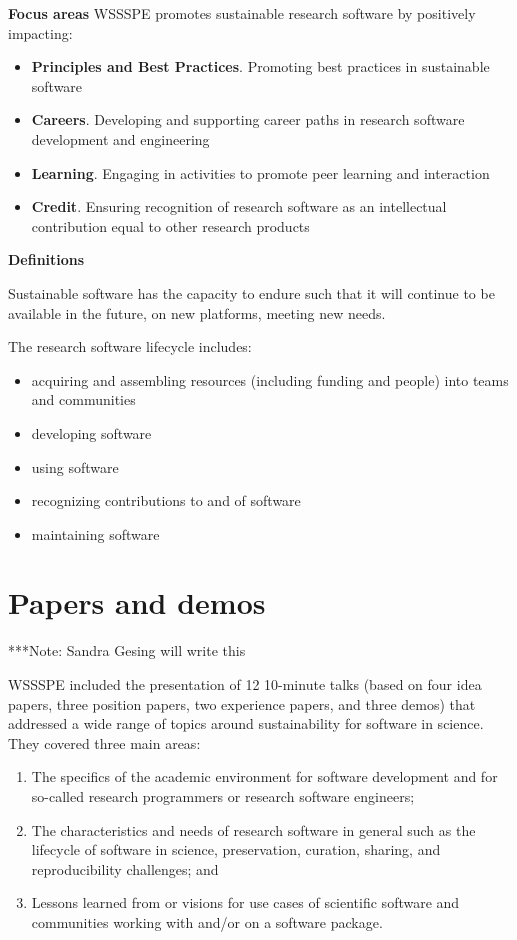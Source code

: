 \documentclass[11pt, oneside]{amsart}
\newcommand{\note}[1]{ {\textcolor{blueish}    { ***Note:      #1 }}}
\begin{document}
{\bf Focus areas}
WSSSPE promotes sustainable research software by positively impacting:
\begin{itemize}
\item {\bf Principles and Best Practices}. Promoting best practices in sustainable software
\item {\bf Careers}. Developing and supporting career paths in research software development and engineering
\item {\bf Learning}. Engaging in activities to promote peer learning and interaction
\item {\bf Credit}. Ensuring recognition of research software as an intellectual contribution equal to other research products
\end{itemize}

{\bf Definitions}

Sustainable software has the capacity to endure such that it will continue to be available in the future, on new platforms, meeting new needs.

The research software lifecycle includes:
\begin{itemize}
\item acquiring and assembling resources (including funding and people) into teams and communities
\item developing software
\item using software
\item recognizing contributions to and of software
\item maintaining software
\end{itemize}


\section{Papers and demos} \label{sec:papers}

\note{Sandra Gesing will write this}

WSSSPE included the presentation of 12 10-minute talks (based on four idea papers, three position papers,
two experience papers, and three demos) that addressed a wide range of topics around
sustainability for software in science. They covered three main areas:
\begin{enumerate}
\item The specifics of the academic environment for software development and for so-called
research programmers or research software engineers;
\item The characteristics and needs of research software in general such as the lifecycle of
software in science, preservation, curation, sharing, and reproducibility challenges; and
\item Lessons learned from or visions for use cases of scientific software and communities
working with and\slash or on a software package.
\end{enumerate}
\end{document}
